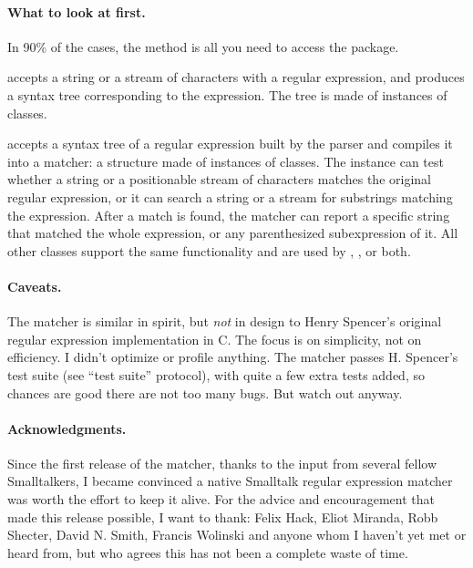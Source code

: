 \documentclass[a4paper,10pt,twoside]{book}
\begin{document}
{\paragraph{What to look at first.}
In 90\% of the cases, the method   is all you need to access the package.

 accepts a string or a stream of characters with a regular expression, and produces a syntax tree corresponding to the expression. The tree is made of instances of  classes.

  accepts a syntax tree of a regular expression built by the parser and compiles it into a matcher: a structure made of instances of  classes. The  instance can test whether a string or a positionable stream of characters matches the original regular expression, or it can search a string or a stream for substrings matching the expression. After a match is found, the matcher can report a specific string that matched the whole expression, or any parenthesized subexpression of it. All other classes support the same functionality and are used by , , or both.

\paragraph{Caveats.} The matcher is similar in spirit, but \emph{not} in design
to Henry Spencer's original regular expression implementation in C.  The focus is on simplicity, not on efficiency. I didn't optimize or profile anything.
The matcher passes H. Spencer's test suite (see ``test suite'' protocol), with quite a few extra tests added, so chances are good there are not too many bugs.  But watch out anyway.

\paragraph{Acknowledgments.}
Since the first release of the matcher, thanks to the input from several fellow Smalltalkers, I became convinced a native Smalltalk regular expression matcher was worth the effort to keep it alive. For the advice and encouragement that made this release possible, I want to thank: Felix Hack, Eliot Miranda, Robb Shecter, David N. Smith, Francis Wolinski and anyone whom I haven't yet met or heard from, but who agrees this has not been a complete waste of time.

}
\end{document}
